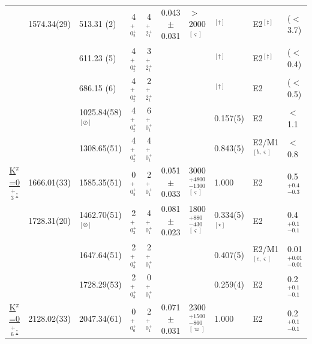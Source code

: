 \begin{landscape}
\begin{center}
\begin{longtable}{cllcccllll}
                                & 1574.34(29)  & 513.31 (2)                 & 4$^+_{0^+_2}$    & 4$^+_{2^+_1}$ &0.043$\pm$0.031& $>$2000$^{[\varsigma]}$                  & $^{[\dagger]}$ & E2$^{[\ddagger]}$ & ($<$3.7) \\
                                &              & 611.23 (5)                 & 4$^+_{0^+_2}$    & 3$^+_{2^+_1}$ &&                                                     & $^{[\dagger]}$ & E2$^{[\ddagger]}$ & ($<$0.4) \\
                                &              & 686.15 (6)                 & 4$^+_{0^+_2}$    & 2$^+_{2^+_1}$ &&                                                     & $^{[\dagger]}$ & E2                & ($<$0.5) \\
                                &              & 1025.84(58)$^{[\oslash]}$  & 4$^+_{0^+_2}$    & 6$^+_{0^+_1}$ &&                                                     & 0.157(5)       & E2                & $<$1.1   \\
                                &              & 1308.65(51)                & 4$^+_{0^+_2}$    & 4$^+_{0^+_1}$ &&                                                     & 0.843(5)       & E2/M1$^{[b,\varsigma]}$& $<$0.8   \\          \hline
\underline{K$^\pi$=0$^+_3$:}    & 1666.01(33)  & 1585.35(51)                & 0$^+_{0^+_3}$    & 2$^+_{0^+_1}$ &0.051$\pm$0.033 & 3000$^{+4800}_{-1300}$ $^{[\varsigma]}$ & 1.000          & E2                & 0.5$^{+0.4}_{-0.3}$   \\
                                & 1728.31(20)  & 1462.70(51)$^{[\otimes]}$ & 2$^+_{0^+_3}$    & 4$^+_{0^+_1}$ &0.081$\pm$0.023& 1800$^{+880}_{-430}$ $^{[\varsigma]}$    &0.334(5)$^{[\star]}$ & E2           & 0.4$^{+0.1}_{-0.1}$ \\   
                                &              & 1647.64(51)                & 2$^+_{0^+_3}$    & 2$^+_{0^+_1}$ &&                                                     &0.407(5)        & E2/M1$^{[c,\varsigma]}$& 0.01$^{+0.01}_{-0.01}$ \\   
                                &              & 1728.29(53)                & 2$^+_{0^+_3}$    & 0$^+_{0^+_1}$ &&                                                     &0.259(4)        & E2                & 0.2$^{+0.1}_{-0.1}$  \\ \hline   
\underline{K$^\pi$=0$^+_6$:}    & 2128.02(33)  & 2047.34(61)                & 0$^+_{0^+_6}$    & 2$^+_{0^+_1}$ &0.071$\pm$0.031& 2300$^{+1500}_{-860}$ $^{[\varpi]}$ &1.000           & E2                & 0.2$^{+0.1}_{-0.1}$       \\  

\end{longtable}
\end{center}
\end{landscape}
